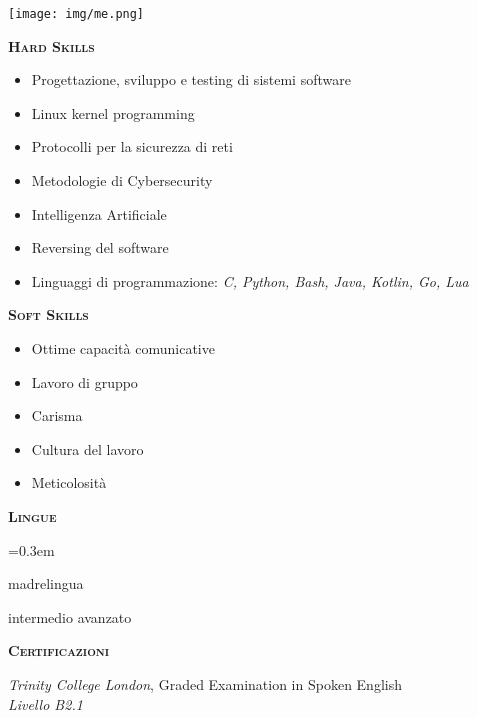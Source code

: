 \documentclass[11pt, a4paper]{article}
\newcommand{\headleft}[1]{\vspace*{5ex}\textsc{\textbf{#1}}\par%
	\vspace*{-1.5ex}\hrulefill\par\vspace*{0.7ex}}
\begin{document}
\setlength{\topskip}{0pt}
\setlength{\parindent}{0pt}
\setlength{\parskip}{0pt}
\setlength{\fboxsep}{0pt}
\pagestyle{empty}
\raggedbottom

\noindent
\begin{minipage}[t]{0.33\textwidth} %
	\colorbox{cvblue}{\color{white}
		\textwidth\relax
		\begin{minipage}[t][298mm][t]{0.82\textwidth}
			\raggedright
			\vspace*{5ex}

			\null\hfill
			\texttt{[image: img/me.png]}
			\hfill\null

			\headleft{Hard Skills}
			\begin{itemize}\itemsep=0.3em
				\item Progettazione, sviluppo e testing di
				      sistemi software
				\item Linux kernel programming
				\item Protocolli per la sicurezza di reti
				\item Metodologie di Cybersecurity
				\item Intelligenza Artificiale
				\item Reversing del software
				\item Linguaggi di programmazione:
				      \textit{C, Python, Bash, Java, Kotlin,
					      Go, Lua}
			\end{itemize}

			\headleft{Soft Skills}
			\begin{itemize}\itemsep=0.3em
				\item Ottime capacit\`a comunicative
				\item Lavoro di gruppo
				\item Carisma
				\item Cultura del lavoro
				\item Meticolosit\`a
			\end{itemize}

			\headleft{Lingue}
			\begin{description}\itemsep=0.3em
				\item[\textsc{Italiano}:] madrelingua
				\item[\textsc{Inglese}:] intermedio avanzato
			\end{description}

			\headleft{Certificazioni}
			{\it Trinity College London}, Graded Examination in
			Spoken English \\
			{\it Livello B2.1}

		\end{minipage}%
		\textwidth\relax
	}
\end{minipage}
\end{document}
